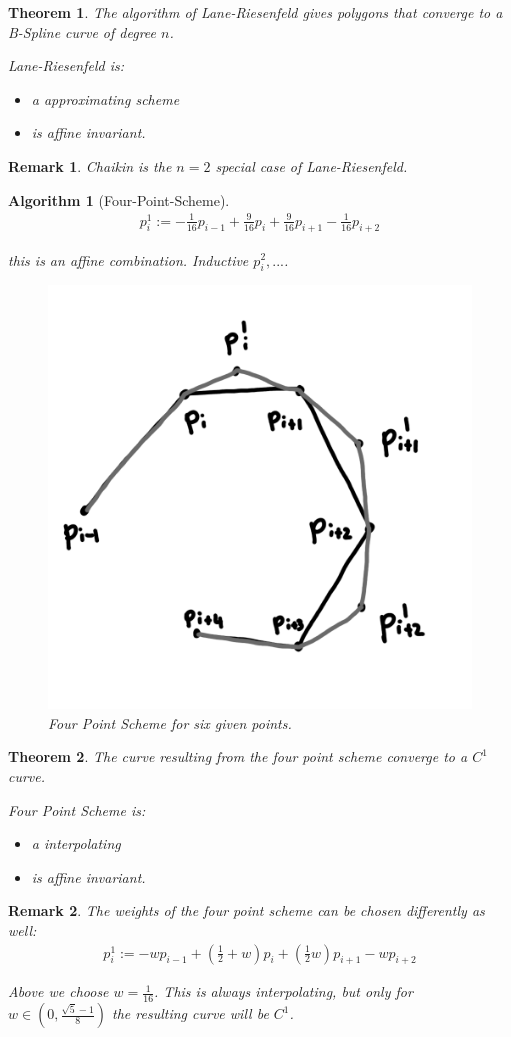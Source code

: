 \documentclass[]{article}
\newtheorem{theorem}{Theorem}
\newtheorem{algorithm}{Algorithm}
\newtheorem{remark}{Remark}
\begin{document}
\begin{theorem}
	The algorithm of Lane-Riesenfeld gives polygons that converge to a B-Spline curve of degree $n$.
	
	Lane-Riesenfeld is:
	\begin{itemize}
		\item a approximating scheme
		\item is affine invariant.
	\end{itemize}
\end{theorem}

\begin{remark}
	Chaikin is the $n=2$ special case of Lane-Riesenfeld.
\end{remark}

\begin{algorithm}[Four-Point-Scheme]
	\begin{align*}
		p_i^1 := -\frac{1}{16} p_{i-1} + \frac{9}{16} p_i + \frac{9}{16} p_{i+1} - \frac{1}{16} p_{i+2}
	\end{align*}
	
	this is an affine combination. Inductive $p_i^2, ...$.
	
	\begin{figure}[h!]
		\centering
		\includegraphics[width=0.3\linewidth]{figures/four_point_scheme}
		\caption{Four Point Scheme for six given points.}
		\label{fig:four_point_scheme}
	\end{figure}
\end{algorithm}

\begin{theorem}
	The curve resulting from the four point scheme converge to a $C^1$ curve.
	
	Four Point Scheme is:
	\begin{itemize}
		\item a interpolating
		\item is affine invariant.
	\end{itemize}
\end{theorem}

\begin{remark}
	The weights of the four point scheme can be chosen differently as well:
	\begin{align*}
		p_i^1 := -w p_{i-1} + (\frac{1}{2} + w) p_i + (\frac{1}{2} w) p_{i+1} - w p_{i+2}
	\end{align*}
	
	Above we choose $w=\frac{1}{16}$. This is always interpolating, but only for $w \in (0, \frac{\sqrt{5} - 1}{8})$ the resulting curve will be $C^1$.
\end{remark}
\end{document}
